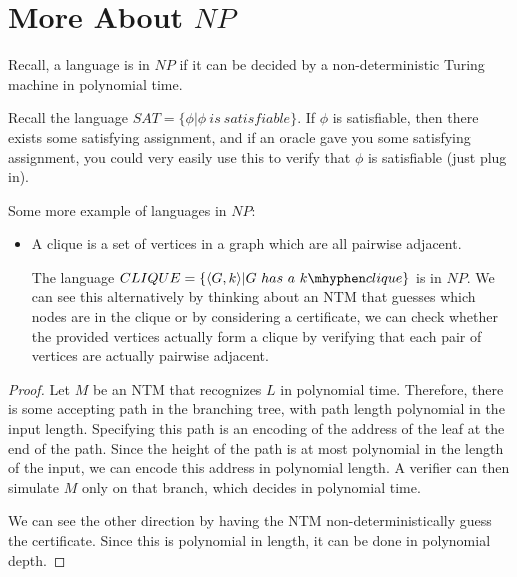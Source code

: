 



\section*{More About $NP$}

Recall, a language is in $NP$ if it can be decided by a non-deterministic Turing machine in polynomial time.

Recall the language $SAT=\{\phi|\phi \ is \ satisfiable\}$.  If $\phi$ is satisfiable, then there exists some satisfying assignment, and if an oracle gave you some satisfying assignment, you could very easily use this to verify that $\phi$ is satisfiable (just plug in).



Some more example of languages in $NP$:
\begin{itemize}
	
	\item A clique is a set of vertices in a graph which are all pairwise adjacent.  
	
	The language $CLIQUE = \{   \langle G,k\rangle | G \ has \ a \ k\mhyphen clique \}$ is in $NP$.  We can see this alternatively by thinking about an NTM that guesses which nodes are in the clique or by considering a certificate, we can check whether the provided vertices actually form a clique by verifying that each pair of vertices are actually pairwise adjacent.

\end{itemize}



\begin{proof}
	Let $M$ be an NTM that recognizes $L$ in polynomial time.  Therefore, there is some accepting path in the branching tree, with path length polynomial in the input length.  Specifying this path is an encoding of the address of the leaf at the end of the path.  Since the height of the path is at most polynomial in the length of the input, we can encode this address in polynomial length.  A verifier can then simulate $M$ only on that branch, which decides in polynomial time.
	
	We can see the other direction by having the NTM non-deterministically guess the certificate.  Since this is polynomial in length, it can be done in polynomial depth.
\end{proof}\\


